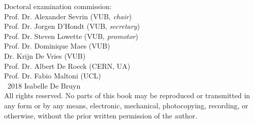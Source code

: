 \documentclass[10pt,a4paper,twoside,dutch,english]{book}
\begin{document}
\clearpage
\thispagestyle{empty}
\large
 \noindent
Doctoral examination commission:\\

 \noindent
Prof. Dr. Alexander Sevrin (VUB, \textit{chair})\\
Prof. Dr. Jorgen D'Hondt (VUB, \textit{secretary})\\
Prof. Dr. Steven Lowette (VUB, \textit{promotor})\\
Prof. Dr. Dominique Maes (VUB)\\
Dr. Krijn De Vries (VUB)\\
Prof. Dr. Albert De Roeck (CERN, UA)\\
Prof. Dr. Fabio Maltoni (UCL)\\

% 
% 
% 
\vfill
 \noindent
\textcopyright\ 2018 Isabelle De Bruyn\\

 \noindent
All rights reserved. No parts of this book may be reproduced or transmitted in any form or by any means, electronic, mechanical, photocopying, recording, or otherwise, without the prior written permission of the author.
\normalsize
% 

\clearpage{\pagestyle{empty}\cleardoublepage}



\frontmatter



\end{document}
